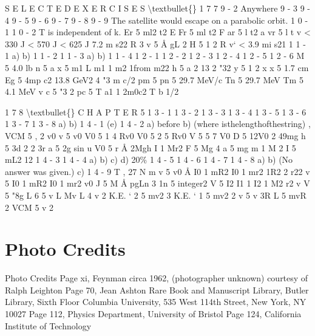 \documentclass[10pt,oneside]{article}
\begin{document}
S E L E C T E D  E X E R C I S E S \textbackslash{}textbullet\{\} 1 7 7 9 - 2 Anywhere 9 - 3 9 - 4 9 - 5 9 - 6 9 - 7 9 - 8 9 - 9 The satellite would escape on a parabolic orbit. 1 0 - 1 1 0 - 2 T is independent of k. Er 5 ml2 t2 E Fr 5 ml t2 F ar 5 l t2 a vr 5 l t v < 330 J < 570 J < 625 J 7.2 m s22 R 3 v 5 Å gL 2 H 5 1 2 R v` < 3.9 mi s21 1 1 - 1 a) b) 1 1 - 2 1 1 - 3 a) b) 1 1 - 4 1 2 - 1 1 2 - 2 1 2 - 3 1 2 - 4 1 2 - 5 1 2 - 6 M 5 4.0 lb n 5 a x 5 m1 L m1 1 m2 1from m22 h 5 a 2 13 2 "32 y 5 1 2 x x 5 1.7 cm Eg 5 4mp c2 13.8 GeV2 4 "3 m c/2 pm 5 pn 5 29.7 MeV/c Tn 5 29.7 MeV Tm 5 4.1 MeV v c 5 "3 2 pc 5 T a1 1 2m0c2 T b 1/2\par

1 7 8 \textbackslash{}textbullet\{\} C H A P T E R  5 1 3 - 1 1 3 - 2 1 3 - 3 1 3 - 4 1 3 - 5 1 3 - 6 1 3 - 7 1 3 - 8 a) b) 1 4 - 1 (e) 1 4 - 2 a) before b) (where isthelengthofthestring) , VCM 5 , 2 v0 v 5 v0 V0 5 1 4 Rv0 V0 5 2 5 Rv0 V 5 5 7 V0 D 5 12V0 2 49mg h 5 3d 2 2 3r a 5 2g sin u V0 5 r Å 2Mgh I 1 Mr2 F 5 Mg 4 a 5 mg m 1 M 2 I 5 mL2 12 1 4 - 3 1 4 - 4 a) b) c) d) 20\% 1 4 - 5 1 4 - 6 1 4 - 7 1 4 - 8 a) b) (No answer was given.) c) 1 4 - 9 T , 27 N m v 5 v0 Å I0 1 mR2 I0 1 mr2 1R2 2 r22 v 5 I0 1 mR2 I0 1 mr2 v0 J 5 M Å pgLn 3  1n 5 integer2 V 5 I2 I1 1 I2 1 M2 r2 v V 5 "8g L 6 5 v L Mv L 4 v 2 K.E. ` 2 5 mv2 3 K.E. ` 1 5 mv2 2 v 5 v 3R L 5 mvR 2 VCM 5 v 2\par

\clearpage
{}
\section*{Photo Credits}
\label{tips-sec-14-photo-credits}
Photo Credits Page xi, Feynman circa 1962, (photographer unknown) courtesy of Ralph Leighton Page 70, Jean Ashton Rare Book and Manuscript Library, Butler Library, Sixth Floor Columbia University, 535 West 114th Street, New York, NY 10027 Page 112, Physics Department, University of Bristol Page 124, California Institute of Technology\par

\clearpage
{}
\end{document}
